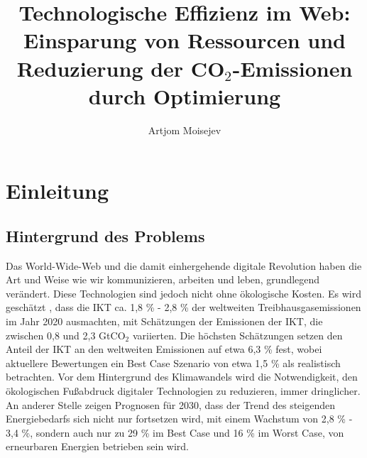 \documentclass[Bachelor,BIF,german,IEEE]{BASE/twbook}
\title{Technologische Effizienz im Web:\\Einsparung von Ressourcen und Reduzierung der CO$_2$-Emissionen durch Optimierung}
\author{Artjom Moisejev}
\begin{document}
\maketitle
\chapter{Einleitung}

\section{Hintergrund des Problems}
\noindent Das World-Wide-Web und die damit einhergehende digitale Revolution haben die Art und Weise wie wir kommunizieren, arbeiten und leben, grundlegend verändert.
Diese Technologien sind jedoch nicht ohne ökologische Kosten.
Es wird geschätzt  \cite{ICT21}, dass die \ac{IKT} ca. 1,8 \% - 2,8 \% der weltweiten Treibhausgasemissionen im Jahr 2020 ausmachten, mit Schätzungen der Emissionen der \ac{IKT}, die zwischen 0,8 und 2,3 GtCO$_2$ variierten.
Die höchsten Schätzungen setzen den Anteil der \ac{IKT} an den weltweiten Emissionen auf etwa 6,3 \% fest, wobei aktuellere Bewertungen ein Best Case Szenario von etwa 1,5 \% als realistisch betrachten.
Vor dem Hintergrund des Klimawandels wird die Notwendigkeit, den ökologischen Fußabdruck digitaler Technologien zu reduzieren, immer dringlicher. An anderer Stelle  \cite{GEU30} zeigen Prognosen für 2030, dass der Trend des steigenden Energiebedarfs sich nicht nur fortsetzen wird, mit einem Wachstum von 2,8 \% - 3,4 \%, sondern auch nur zu 29 \% im Best Case und 16 \% im Worst Case, von erneurbaren Energien betrieben sein wird.
\end{document}
